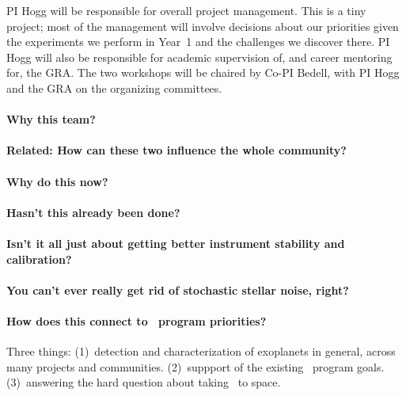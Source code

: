 \documentclass[12pt, letterpaper]{article}
\begin{document}
PI Hogg will be responsible for overall project management. This is a
tiny project; most of the management will involve decisions about our
priorities given the experiments we perform in Year~1 and the
challenges we discover there.
PI Hogg will also be responsible for academic supervision of, and
career mentoring for, the GRA.
The two workshops will be chaired by Co-PI Bedell, with PI Hogg and
the GRA on the organizing committees.



\paragraph{Why this team?}

\paragraph{Related: How can these two influence the whole community?}

\paragraph{Why do this now?}

\paragraph{Hasn't this already been done?}

\paragraph{Isn't it all just about getting better instrument stability and calibration?}

\paragraph{You can't ever really get rid of stochastic stellar noise, right?}

\paragraph{How does this connect to \XRP\ program priorities?}

Three things: (1)~detection and characterization of exoplanets in
general, across many projects and communities. (2)~suppport of the
existing \NNEXPLORE\ program goals. (3)~answering the hard question
about taking \EPRV\ to space.
\end{document}
